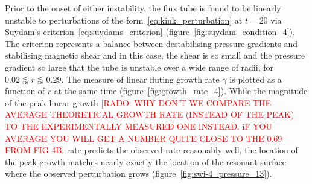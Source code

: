 \documentclass[12pt]{article}
\newcommand{\rs}[2]{\textcolor{red}{#2}}
\begin{document}
Prior to the onset of either instability, the flux tube is found to be
linearly unstable to perturbations of the
form~\eqref{eq:kink_perturbation} at $t=20$ via Suydam's
criterion~\eqref{eq:suydams_criterion}
(figure~\ref{fig:suydam_condition_4}). The criterion represents a
balance between destabilising pressure gradients and stabilising
magnetic shear and in this case, the shear is so small and the
pressure gradient so large that the tube is unstable over a wide range
of radii, for $ 0.02 \lessapprox r \lessapprox 0.29$. The measure of
linear fluting growth rate $\gamma$ is plotted as a function of $r$ at
the same time (figure~\ref{fig:growth_rate_4}). While the magnitude of
the peak linear growth \rs{}{[RADO: WHY DON'T WE COMPARE THE AVERAGE THEORETICAL GROWTH RATE 
    (INSTEAD OF THE PEAK) TO THE EXPERIMENTALLY MEASURED ONE
    INSTEAD. iF YOU AVERAGE YOU WILL GET A NUMBER QUITE CLOSE TO THE
   0.69 FROM FIG 4B.} rate predicts the observed rate reasonably well, the location of the peak growth matches nearly exactly the location of the resonant surface where the observed perturbation grows (figure~\ref{fig:swi-4_pressure_13}).
\end{document}

